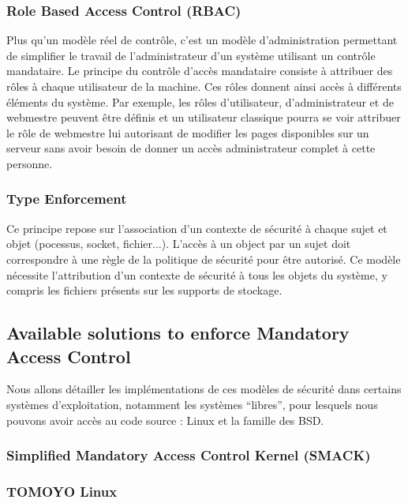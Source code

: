 \documentclass[pdftex,a4paper,titlepage,11pt]{article}
\begin{document}
\subsubsection{Role Based Access Control (RBAC)}

Plus qu'un modèle réel de contrôle, c'est un modèle d'administration permettant de simplifier le travail de l'administrateur d'un système utilisant un contrôle mandataire. Le principe du contrôle d'accès mandataire consiste à attribuer des rôles à chaque utilisateur de la machine. Ces rôles donnent ainsi accès à différents éléments du système. Par exemple, les rôles d'utilisateur, d'administrateur et de webmestre peuvent être définis et un utilisateur classique pourra se voir attribuer le rôle de webmestre lui autorisant de modifier les pages disponibles sur un serveur sans avoir besoin de donner un accès administrateur complet à cette personne.

\subsubsection{Type Enforcement}

Ce principe repose sur l'association d'un contexte de sécurité à chaque sujet et objet (pocessus, socket, fichier...). L'accès à un object par un sujet doit correspondre à une règle de la politique de sécurité pour être autorisé. Ce modèle nécessite l'attribution d'un contexte de sécurité à tous les objets du système, y compris les fichiers présents sur les supports de stockage.

\subsection{Available solutions to enforce Mandatory Access Control}

Nous allons détailler les implémentations de ces modèles de sécurité dans certains systèmes d'exploitation, notamment les systèmes ``libres'', pour lesquels nous pouvons avoir accès au code source : Linux et la famille des BSD.

\subsubsection{Simplified Mandatory Access Control Kernel (SMACK)}

\subsubsection{TOMOYO Linux}
\end{document}

